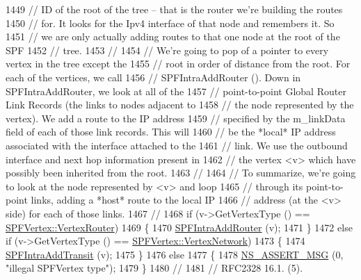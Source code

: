 \begin{DoxyCode}
1449 \textcolor{comment}{// ID of the root of the tree -- that is the router we're building the routes}
1450 \textcolor{comment}{// for.  It looks for the Ipv4 interface of that node and remembers it.  So}
1451 \textcolor{comment}{// we are only actually adding routes to that one node at the root of the SPF }
1452 \textcolor{comment}{// tree.}
1453 \textcolor{comment}{//}
1454 \textcolor{comment}{// We're going to pop of a pointer to every vertex in the tree except the }
1455 \textcolor{comment}{// root in order of distance from the root.  For each of the vertices, we call}
1456 \textcolor{comment}{// SPFIntraAddRouter ().  Down in SPFIntraAddRouter, we look at all of the }
1457 \textcolor{comment}{// point-to-point Global Router Link Records (the links to nodes adjacent to}
1458 \textcolor{comment}{// the node represented by the vertex).  We add a route to the IP address }
1459 \textcolor{comment}{// specified by the m\_linkData field of each of those link records.  This will}
1460 \textcolor{comment}{// be the *local* IP address associated with the interface attached to the }
1461 \textcolor{comment}{// link.  We use the outbound interface and next hop information present in }
1462 \textcolor{comment}{// the vertex <v> which have possibly been inherited from the root.}
1463 \textcolor{comment}{//}
1464 \textcolor{comment}{// To summarize, we're going to look at the node represented by <v> and loop}
1465 \textcolor{comment}{// through its point-to-point links, adding a *host* route to the local IP}
1466 \textcolor{comment}{// address (at the <v> side) for each of those links.}
1467 \textcolor{comment}{//}
1468       \textcolor{keywordflow}{if} (v->GetVertexType () == \hyperlink{classns3_1_1SPFVertex_a20f8a4cfc99a1b7ecd10a23151b93afda340822983a2833fff14de88ea20a3f31}{SPFVertex::VertexRouter})
1469         \{
1470           \hyperlink{classns3_1_1GlobalRouteManagerImpl_adc0725b441a01d02bc4db842771a36d5}{SPFIntraAddRouter} (v);
1471         \}
1472       \textcolor{keywordflow}{else} \textcolor{keywordflow}{if} (v->GetVertexType () == \hyperlink{classns3_1_1SPFVertex_a20f8a4cfc99a1b7ecd10a23151b93afda00415acb788d8d95bee545fe2046c2a8}{SPFVertex::VertexNetwork})
1473         \{
1474           \hyperlink{classns3_1_1GlobalRouteManagerImpl_aaafd698f94e453e3fe41f08bd62867be}{SPFIntraAddTransit} (v);
1475         \}
1476       \textcolor{keywordflow}{else}
1477         \{
1478           \hyperlink{assert_8h_aff5ece9066c74e681e74999856f08539}{NS\_ASSERT\_MSG} (0, \textcolor{stringliteral}{"illegal SPFVertex type"});
1479         \}
1480 \textcolor{comment}{//}
1481 \textcolor{comment}{// RFC2328 16.1. (5). }

\end{DoxyCode}
